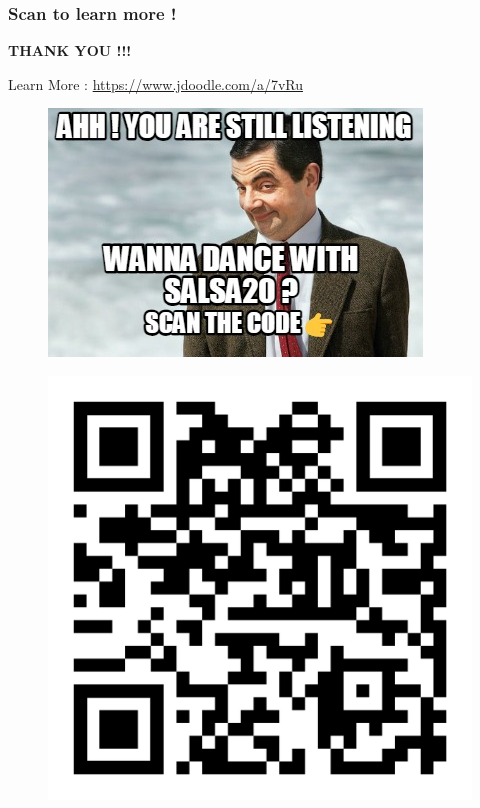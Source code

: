 \begin{frame}
\frametitle{Scan to learn more !}

\Large{\centerline{\textbf{THANK YOU !!!}}}
\centering
\small{Learn More : \url{https://www.jdoodle.com/a/7vRu}}
\begin{multicols}{2}
\begin{figure}
    \centering
    \includegraphics[scale=0.45]{5647082.jpg}
\end{figure}
\columnbreak
\begin{figure}
    \centering
    \includegraphics[scale=0.12]{qr-code.png}
\end{figure}
\end{multicols}

\end{frame}